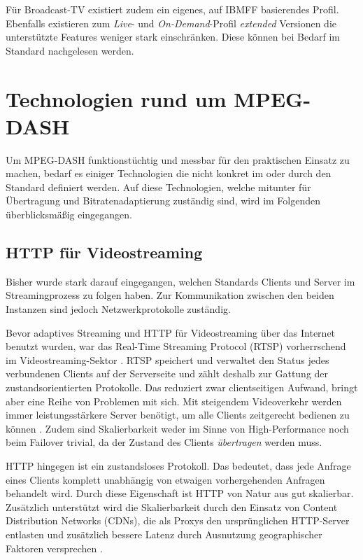 \documentclass[paper = a4, fontsize = 12pt, parskip = half]{scrartcl} %
\begin{document}
Für Broadcast-TV existiert zudem ein eigenes, auf IBMFF basierendes Profil. Ebenfalls existieren zum \textit{Live}- und \textit{On-Demand}-Profil \textit{extended} Versionen die unterstützte Features weniger stark einschränken. Diese können bei Bedarf im Standard nachgelesen werden.

\section{Technologien rund um MPEG-DASH}
Um MPEG-DASH funktionstüchtig und messbar für den praktischen Einsatz zu machen, bedarf es einiger Technologien die nicht konkret im oder durch den Standard definiert werden. Auf diese Technologien, welche mitunter für Übertragung und Bitratenadaptierung zuständig sind, wird im Folgenden überblicksmäßig eingegangen.

\subsection{HTTP für Videostreaming}
Bisher wurde stark darauf eingegangen, welchen Standards Clients und Server im Streamingprozess zu folgen haben. Zur Kommunikation zwischen den beiden Instanzen sind jedoch Netzwerkprotokolle zuständig.

Bevor adaptives Streaming und HTTP für Videostreaming über das Internet benutzt wurden, war das Real-Time Streaming Protocol (RTSP) vorherrschend im Videostreaming-Sektor \cite{stockhammer_dynamic_2011}. RTSP speichert und verwaltet den Status jedes verbundenen Clients auf der Serverseite und zählt deshalb zur Gattung der zustandsorientierten Protokolle. Das reduziert zwar clientseitigen Aufwand, bringt aber eine Reihe von Problemen mit sich. Mit steigendem Videoverkehr werden immer leistungsstärkere Server benötigt, um alle Clients zeitgerecht bedienen zu können \cite{stockhammer_dynamic_2011}. Zudem sind Skalierbarkeit weder im Sinne von High-Performance noch beim Failover trivial, da der Zustand des Clients \textit{übertragen} werden muss.

HTTP hingegen ist ein zustandsloses Protokoll. Das bedeutet, dass jede Anfrage eines Clients komplett unabhängig von etwaigen vorhergehenden Anfragen behandelt wird. Durch diese Eigenschaft ist HTTP von Natur aus gut skalierbar. Zusätzlich unterstützt wird die Skalierbarkeit durch den Einsatz von Content Distribution Networks (CDNs), die als Proxys den ursprünglichen HTTP-Server entlasten und zusätzlich bessere Latenz durch Ausnutzung geographischer Faktoren versprechen \cite{buyya_content_2008}.
\end{document}
